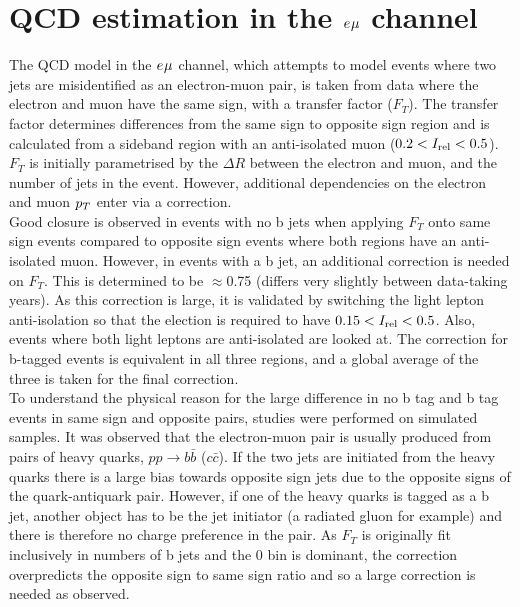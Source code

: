 \section{QCD estimation in the $e_{}\mu_{}$ channel}
\label{sec:qcd}

The \ac{QCD} model in the $e_{}\mu_{}$ channel, which attempts to model events where two jets are misidentified as an electron-muon pair, is taken from data where the electron and muon have the same sign, with a transfer factor ($F_{T}$).
The transfer factor determines differences from the same sign to opposite sign region and is calculated from a sideband region with an anti-isolated muon ($0.2 < I_{\text{rel}} < 0.5$).
$F_{T}$ is initially parametrised by the $\Delta R$ between the electron and muon, and the number of jets in the event.
However, additional dependencies on the electron and muon $p_{T}$ enter via a correction. \\

Good closure is observed in events with no b jets when applying $F_{T}$ onto same sign events compared to opposite sign events where both regions have an anti-isolated muon. 
However, in events with a b jet, an additional correction is needed on $F_{T}$.
This is determined to be $\approx$0.75 (differs very slightly between data-taking years).
As this correction is large, it is validated by switching the light lepton anti-isolation so that the election is required to have $0.15 < I_{\text{rel}} < 0.5$.
Also, events where both light leptons are anti-isolated are looked at.
The correction for b-tagged events is equivalent in all three regions, and a global average of the three is taken for the final correction. \\

To understand the physical reason for the large difference in no b tag and b tag events in same sign and opposite pairs, studies were performed on simulated samples.
It was observed that the electron-muon pair is usually produced from pairs of heavy quarks, $pp\rightarrow b\bar{b}$ ($c\bar{c}$).
If the two jets are initiated from the heavy quarks there is a large bias towards opposite sign jets due to the opposite signs of the quark-antiquark pair.
However, if one of the heavy quarks is tagged as a b jet, another object has to be the jet initiator (a radiated gluon for example) and there is therefore no charge preference in the pair.
As $F_{T}$ is originally fit inclusively in numbers of b jets and the 0 bin is dominant, the correction overpredicts the opposite sign to same sign ratio and so a large correction is needed as observed.

